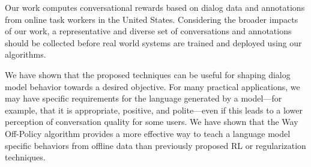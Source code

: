 Our work computes conversational rewards based on dialog data and annotations from online task workers in the United States. Considering the broader impacts of our work, a representative and diverse set of conversations and annotations should be collected before real world systems are trained and deployed using our algorithms. 

We have shown that the proposed techniques can be useful for shaping dialog model behavior towards a desired objective. For many practical applications, we may have specific requirements for the language generated by a model---for example, that it is appropriate, positive, and polite---even if this leads to a lower perception of conversation quality for some users. We have shown that the Way Off-Policy algorithm provides a more effective way to teach a language model specific behaviors from offline data than previously proposed RL or regularization techniques.


